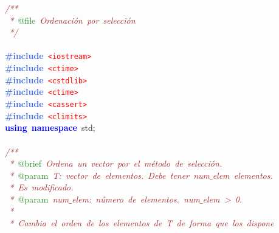\noindent
\mbox{}\textit{\textcolor{Brown}{/**}} \\
\mbox{}\textit{\textcolor{Brown}{\ *\ }}\textcolor{ForestGreen}{@file}\textit{\textcolor{Brown}{\ Ordenación\ por\ selección}} \\
\mbox{}\textit{\textcolor{Brown}{\ */}} \\
\mbox{} \\
\mbox{}\textbf{\textcolor{RoyalBlue}{\#include}}\ \texttt{\textcolor{Red}{\textless{}iostream\textgreater{}}} \\
\mbox{}\textbf{\textcolor{RoyalBlue}{\#include}}\ \texttt{\textcolor{Red}{\textless{}ctime\textgreater{}}} \\
\mbox{}\textbf{\textcolor{RoyalBlue}{\#include}}\ \texttt{\textcolor{Red}{\textless{}cstdlib\textgreater{}}} \\
\mbox{}\textbf{\textcolor{RoyalBlue}{\#include}}\ \texttt{\textcolor{Red}{\textless{}ctime\textgreater{}}} \\
\mbox{}\textbf{\textcolor{RoyalBlue}{\#include}}\ \texttt{\textcolor{Red}{\textless{}cassert\textgreater{}}} \\
\mbox{}\textbf{\textcolor{RoyalBlue}{\#include}}\ \texttt{\textcolor{Red}{\textless{}climits\textgreater{}}} \\
\mbox{}\textbf{\textcolor{Blue}{using}}\ \textbf{\textcolor{Blue}{namespace}}\ std\textcolor{BrickRed}{;} \\
\mbox{} \\
\mbox{}\textit{\textcolor{Brown}{/**}} \\
\mbox{}\textit{\textcolor{Brown}{\ *\ }}\textcolor{ForestGreen}{@brief}\textit{\textcolor{Brown}{\ Ordena\ un\ vector\ por\ el\ método\ de\ selección.}} \\
\mbox{}\textit{\textcolor{Brown}{\ *\ }}\textcolor{ForestGreen}{@param}\textit{\textcolor{Brown}{\ T:\ vector\ de\ elementos.\ Debe\ tener\ num$\_$elem\ elementos.}} \\
\mbox{}\textit{\textcolor{Brown}{\ *\ Es\ modificado.}} \\
\mbox{}\textit{\textcolor{Brown}{\ *\ }}\textcolor{ForestGreen}{@param}\textit{\textcolor{Brown}{\ num$\_$elem:\ número\ de\ elementos.\ num$\_$elem\ \textgreater{}\ 0.}} \\
\mbox{}\textit{\textcolor{Brown}{\ *\ }} \\
\mbox{}\textit{\textcolor{Brown}{\ *\ Cambia\ el\ orden\ de\ los\ elementos\ de\ T\ de\ forma\ que\ los\ dispone}} \\
